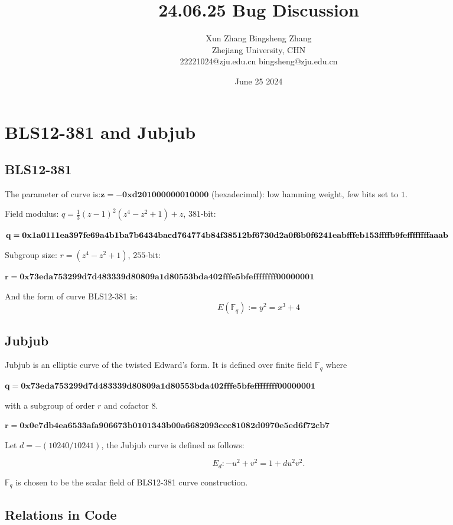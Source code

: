 \documentclass{article}
\title{24.06.25 Bug Discussion}
\author{Xun Zhang \quad \quad Bingsheng Zhang \\ 
Zhejiang University, CHN \\
22221024@zju.edu.cn \quad bingsheng@zju.edu.cn}
\date{June 25 2024}
\begin{document}
\maketitle

\section{BLS12-381 and Jubjub}

\subsection{BLS12-381}


The parameter of curve is:$\mathbf{z = -0xd201000000010000}$ (hexadecimal): low hamming weight, few bits set to $1$.

Field modulus: $q = \frac{1}{3}(z-1)^2(z^4 - z^2 + 1) + z$, $381$-bit:

$\mathbf{q = 0x1a0111ea397fe69a4b1ba7b6434bacd764774b84f38512bf6730d2a0f6b0f62} \\
\mathbf{41eabfffeb153ffffb9feffffffffaaab}$





Subgroup size: $r = (z^4 - z^2 + 1)$, $255$-bit:

  $\mathbf{r = 0x73eda753299d7d483339d80809a1d80553bda402fffe5bfeffffffff00000001}$


And the form of curve BLS12-381 is:
\[
E(\mathbb{F}_q) := y^2 = x^3 + 4
\]


\subsection{Jubjub}
Jubjub is an elliptic curve of the twisted Edward's form. It is defined over finite field $\mathbb{F}_q$ where

$\mathbf{q = 0x73eda753299d7d483339d80809a1d80553bda402fffe5bfeffffffff00000001}$

with a subgroup of order $r$ and cofactor $8$.

$\mathbf{r = 0x0e7db4ea6533afa906673b0101343b00a6682093ccc81082d0970e5ed6f72cb7}$

Let $d = -(10240/10241)$, the Jubjub curve is defined as follows:

$$E_{d}: -u^2 + v^2 = 1 + du^2v^2.$$

$\mathbb{F}_q$ is chosen to be the scalar field of BLS12-381 curve construction.


\subsection{Relations in Code}
\end{document}
